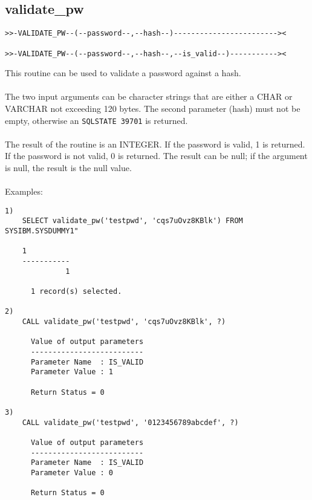 \subsection{validate\_pw} \label{validatepw}
\begin{verbatim}
>>-VALIDATE_PW--(--password--,--hash--)------------------------><

>>-VALIDATE_PW--(--password--,--hash--,--is_valid--)-----------><
\end{verbatim}
This routine can be used to validate a password against a hash.\\
\\
The two input arguments can be character strings that are either a CHAR or VARCHAR not exceeding 120 bytes. The second parameter (hash) must not be 
empty, otherwise an \mbox{{\tt SQLSTATE 39701}} is returned.\\
\\
The result of the routine is an INTEGER. If the password is valid, 1 is returned. If the password is not valid, 0 is returned. The result can be null; if the argument is null, the result is the null value.\\
\\
Examples:
\begin{verbatim}
1)
    SELECT validate_pw('testpwd', 'cqs7uOvz8KBlk') FROM SYSIBM.SYSDUMMY1"

    1          
    -----------
              1

      1 record(s) selected.

2)
    CALL validate_pw('testpwd', 'cqs7uOvz8KBlk', ?)

      Value of output parameters
      --------------------------
      Parameter Name  : IS_VALID
      Parameter Value : 1

      Return Status = 0

3)
    CALL validate_pw('testpwd', '0123456789abcdef', ?)

      Value of output parameters
      --------------------------
      Parameter Name  : IS_VALID
      Parameter Value : 0

      Return Status = 0
\end{verbatim}